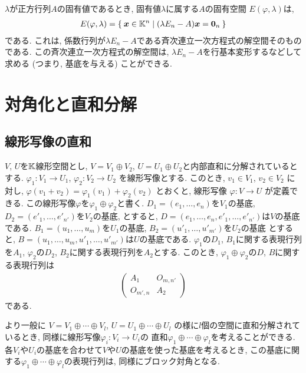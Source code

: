 $\lambda$が正方行列$A$の固有値であるとき,
固有値$\lambda$に属する$A$の固有空間
$E(\varphi,\lambda)$は,
\begin{align*}
    E(\varphi,\lambda) = \Set{\boldsymbol{x}\in\mathbb{K}^n|(\lambda E_n-A)\boldsymbol{x}=\boldsymbol{0}_n}
\end{align*}
である.
これは,
係数行列が$\lambda E_n-A$である斉次連立一次方程式の解空間そのものである.
この斉次連立一次方程式の解空間は,
$\lambda E_n-A$を行基本変形するなどして求める
(つまり, 基底を与える) ことができる.

\begin{quiz}
\end{quiz}



\chapter{対角化と直和分解}
\label{chap:diagonalize}
\section{線形写像の直和}
$V$, $U$を$\mathbb{K}$線形空間とし,
$V=V_1\oplus V_2$,
$U=U_1\oplus U_2$と内部直和に分解されているとする.
$\varphi_1\colon V_1\to U_1$,
$\varphi_2\colon V_2\to U_2$
を線形写像とする.
このとき,
$v_1\in V_1$, $v_2\in V_2$
に対し,
$\varphi(v_1+v_2)=\varphi_1(v_1)+\varphi_2(v_2)$
とおくと,
線形写像
$\varphi\colon V\to U$
が定義できる.
この線形写像$\varphi$を$\varphi_1\oplus \varphi_2$と書く.
$D_1=(e_1,\ldots,e_n)$を$V_1$の基底,
$D_2=(e'_1,\ldots,e'_{n'})$を$V_2$の基底,
とすると,
$D=(e_1,\ldots,e_n,e'_1,\ldots,e'_{n'})$は$V$の基底である.
$B_1=(u_1,\ldots,u_m)$を$U_1$の基底,
$B_2=(u'_1,\ldots,u'_{m'})$を$U_2$の基底
とすると,
$B=(u_1,\ldots,u_m,u'_1,\ldots,u'_{m'})$は$U$の基底である.
$\varphi_1$の$D_1$, $B_1$に関する表現行列を$A_1$,
$\varphi_2$の$D_2$, $B_2$に関する表現行列を$A_2$とする.
このとき,
$\varphi_1\oplus \varphi_2$の$D$, $B$に関する表現行列は
\begin{align*}
  \begin{pmatrix}A_1&O_{m,n'}\\O_{m',n}&A_2\end{pmatrix}
\end{align*}
である.

より一般に
$V=V_1\oplus \cdots \oplus V_l$,
$U=U_1\oplus \cdots \oplus U_l$
の様に$l$個の空間に直和分解されているとき,
同様に線形写像$\varphi_i\colon V_i\to U_i$の
直和$\varphi_1\oplus \cdots \oplus \varphi_l$を考えることができる.
各$V_i$や$U_i$の基底を合わせて$V$や$U$の基底を使った基底を考えるとき,
この基底に関する$\varphi_1\oplus \cdots \oplus \varphi_l$の表現行列は,
同様にブロック対角となる.


